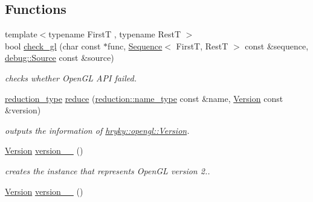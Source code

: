 \subsection*{Functions}
\begin{DoxyCompactItemize}
\item 
\hypertarget{namespacehryky_1_1opengl_a068d66e76fc06a43c45d3c8da7a75ce5}{{\footnotesize template$<$typename First\-T , typename Rest\-T $>$ }\\bool \hyperlink{namespacehryky_1_1opengl_a068d66e76fc06a43c45d3c8da7a75ce5}{check\-\_\-gl} (char const $\ast$func, \hyperlink{classhryky_1_1_sequence}{Sequence}$<$ First\-T, Rest\-T $>$ const \&sequence, \hyperlink{classhryky_1_1debug_1_1_source}{debug\-::\-Source} const \&source)}\label{namespacehryky_1_1opengl_a068d66e76fc06a43c45d3c8da7a75ce5}

\begin{DoxyCompactList}\small\item\em checks whether Open\-G\-L A\-P\-I failed. \end{DoxyCompactList}\item 
\hypertarget{namespacehryky_1_1opengl_a1f50a28d54b84ea181f698a67dca08e1}{\hyperlink{namespacehryky_a343a9a4c36a586be5c2693156200eadc}{reduction\-\_\-type} \hyperlink{namespacehryky_1_1opengl_a1f50a28d54b84ea181f698a67dca08e1}{reduce} (\hyperlink{namespacehryky_1_1reduction_ac686c30a4c8d196bbd0f05629a6b921f}{reduction\-::name\-\_\-type} const \&name, \hyperlink{classhryky_1_1opengl_1_1_version}{Version} const \&version)}\label{namespacehryky_1_1opengl_a1f50a28d54b84ea181f698a67dca08e1}

\begin{DoxyCompactList}\small\item\em outputs the information of \hyperlink{classhryky_1_1opengl_1_1_version}{hryky\-::opengl\-::\-Version}. \end{DoxyCompactList}\item 
\hypertarget{namespacehryky_1_1opengl_ad642afa7961d36eaceb81c1c75b9476d}{\hyperlink{classhryky_1_1opengl_1_1_version}{Version} \hyperlink{namespacehryky_1_1opengl_ad642afa7961d36eaceb81c1c75b9476d}{version\-\_\-\_} ()}\label{namespacehryky_1_1opengl_ad642afa7961d36eaceb81c1c75b9476d}

\begin{DoxyCompactList}\small\item\em creates the instance that represents Open\-G\-L version 2.. \end{DoxyCompactList}\item 
\hypertarget{namespacehryky_1_1opengl_add161d3235f18e84c734bf3a28c2f80e}{\hyperlink{classhryky_1_1opengl_1_1_version}{Version} \hyperlink{namespacehryky_1_1opengl_add161d3235f18e84c734bf3a28c2f80e}{version\-\_\-\_} ()}\label{namespacehryky_1_1opengl_add161d3235f18e84c734bf3a28c2f80e}


\end{DoxyCompactItemize}
